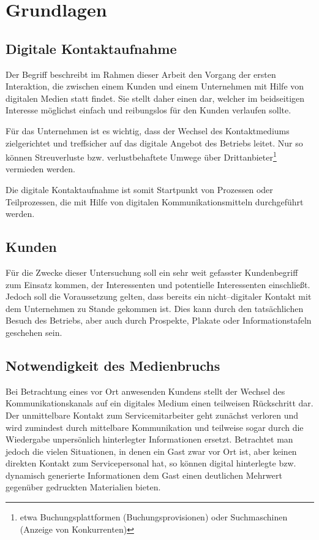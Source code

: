 \section{Grundlagen}
\label{sec:grundlagen}

\subsection{Digitale Kontaktaufnahme}

Der Begriff  beschreibt im Rahmen dieser Arbeit den Vorgang der ersten Interaktion, die zwischen einem Kunden und einem Unternehmen mit Hilfe von digitalen Medien statt findet. Sie stellt daher einen  dar, welcher im beidseitigen Interesse möglichst einfach und reibungslos für den Kunden verlaufen sollte. 

Für das Unternehmen ist es wichtig, dass der Wechsel des Kontaktmediums zielgerichtet und treffsicher auf das digitale Angebot des Betriebs leitet. Nur so können Streuverluste bzw. verlustbehaftete Umwege über Drittanbieter\footnote{etwa Buchungsplattformen (Buchungsprovisionen) oder Suchmaschinen (Anzeige von Konkurrenten)} vermieden werden.

Die digitale Kontaktaufnahme ist somit Startpunkt von Prozessen oder Teilprozessen, die mit Hilfe von digitalen Kommunikationsmitteln durchgeführt werden.

\subsection{Kunden}

Für die Zwecke dieser Untersuchung soll ein sehr weit gefasster Kundenbegriff zum Einsatz kommen, der Interessenten und potentielle Interessenten einschließt. Jedoch soll die Voraussetzung gelten, dass bereits ein nicht--digitaler Kontakt mit dem Unternehmen zu Stande gekommen ist. Dies kann durch den tatsächlichen Besuch des Betriebs, aber auch durch Prospekte, Plakate oder Informationstafeln geschehen sein.

\subsection{Notwendigkeit des Medienbruchs}
\label{sec:medienbruch}

Bei Betrachtung eines vor Ort anwesenden Kundens stellt der Wechsel des Kommunikationskanals auf ein digitales Medium einen teilweisen Rückschritt dar. Der unmittelbare Kontakt zum Servicemitarbeiter geht zunächst verloren und wird zumindest durch mittelbare Kommunikation und teilweise sogar durch die Wiedergabe unpersönlich hinterlegter Informationen ersetzt.
Betrachtet man jedoch die vielen Situationen, in denen ein Gast zwar vor Ort ist, aber keinen direkten Kontakt zum Servicepersonal hat, so können digital hinterlegte bzw. dynamisch generierte Informationen dem Gast einen deutlichen Mehrwert gegenüber gedruckten Materialien bieten.

